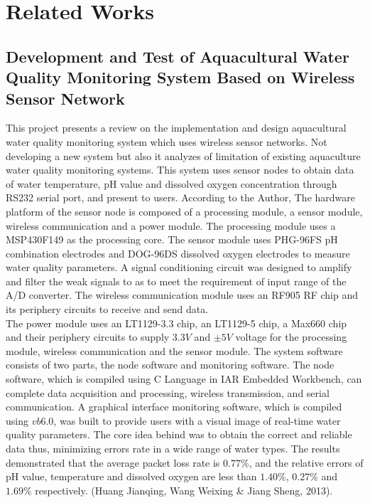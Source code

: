 \documentclass[12pt]{article}
\begin{document}
	\section*{Related Works}
			\subsection*{Development and Test of Aquacultural Water Quality Monitoring System Based on Wireless Sensor Network}	
This project presents a review on the implementation and design aquacultural water quality monitoring system which uses wireless sensor networks. Not developing a new system but also it analyzes of limitation of existing aquaculture water quality monitoring systems. This system uses sensor nodes to obtain data of water temperature, pH value and dissolved oxygen concentration through RS232 serial port, and present to users. According to the Author, The hardware platform of the sensor node is composed of a processing module, a sensor module, wireless communication and a power module. The processing module uses a MSP430F149 as the processing core. The sensor module uses PHG-96FS pH combination electrodes and DOG-96DS dissolved oxygen electrodes to measure water quality parameters. A signal conditioning circuit was designed to amplify and filter the weak signals to as to meet the requirement of input range of the A/D converter. The wireless communication module uses an RF905 RF chip and its periphery circuits to receive and send data.\\

 The power module uses an 
 LT1129-3.3 chip, an LT1129-5 chip, 
 a Max660 chip and their periphery circuits to supply $3.3V$ and
 $\pm5V$ 
  voltage for the processing module, wireless communication and the sensor module. The system software consists of two parts, the node software and monitoring software. The node software, which is compiled using C Language in IAR Embedded Workbench, can complete data acquisition and processing, wireless transmission, and serial communication. A graphical interface monitoring software, which is compiled using $vb6.0$, 
 was built to provide users with a visual image of real-time water quality parameters. The core idea behind was to obtain the correct and reliable data thus, minimizing errors rate in a wide range of water types. The results demonstrated that the average packet loss rate is $0.77\%$, and the relative errors of pH value, temperature and dissolved oxygen are less than $1.40\%$, $0.27\%$ and $1.69\%$ respectively. (Huang Jianqing, Wang Weixing \& Jiang Sheng, 2013).
\end{document}
